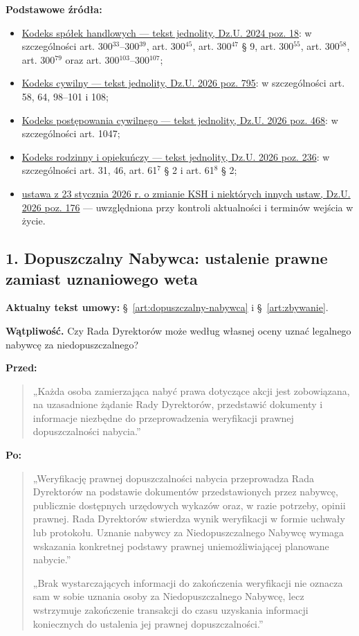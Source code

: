 \documentclass[12pt,a4paper]{report}
\begin{document}
\smallskip
\textbf{Podstawowe źródła:}
\begin{itemize}
  \item \href{https://eli.gov.pl/api/acts/DU/2024/18/text.html}{Kodeks spółek handlowych --- tekst jednolity, Dz.U. 2024 poz. 18}: w szczególności art. 300$^{33}$--300$^{39}$, art. 300$^{45}$, art. 300$^{47}$ § 9, art. 300$^{55}$, art. 300$^{58}$, art. 300$^{79}$ oraz art. 300$^{103}$--300$^{107}$;
  \item \href{https://eli.gov.pl/eli/DU/2026/795/ogl}{Kodeks cywilny --- tekst jednolity, Dz.U. 2026 poz. 795}: w szczególności art. 58, 64, 98--101 i 108;
  \item \href{https://eli.gov.pl/eli/DU/2026/468/ogl}{Kodeks postępowania cywilnego --- tekst jednolity, Dz.U. 2026 poz. 468}: w szczególności art. 1047;
  \item \href{https://eli.gov.pl/eli/DU/2026/236/ogl}{Kodeks rodzinny i opiekuńczy --- tekst jednolity, Dz.U. 2026 poz. 236}: w szczególności art. 31, 46, art. 61$^{7}$ § 2 i art. 61$^{8}$ § 2;
  \item \href{https://eli.gov.pl/eli/DU/2026/176/ogl}{ustawa z 23 stycznia 2026 r. o zmianie KSH i niektórych innych ustaw, Dz.U. 2026 poz. 176} --- uwzględniona przy kontroli aktualności i terminów wejścia w życie.
\end{itemize}

\subsection*{1. Dopuszczalny Nabywca: ustalenie prawne zamiast uznaniowego weta}
\textbf{Aktualny tekst umowy:} §~\ref{art:dopuszczalny-nabywca} i §~\ref{art:zbywanie}.

\textbf{Wątpliwość.} Czy Rada Dyrektorów może według własnej oceny uznać legalnego nabywcę za niedopuszczalnego?

\textbf{Przed:}
\begin{quote}\small
„Każda osoba zamierzająca nabyć prawa dotyczące akcji jest zobowiązana, na uzasadnione żądanie Rady Dyrektorów, przedstawić dokumenty i informacje niezbędne do przeprowadzenia weryfikacji prawnej dopuszczalności nabycia.”
\end{quote}

\textbf{Po:}
\begin{quote}\small
„Weryfikację prawnej dopuszczalności nabycia przeprowadza Rada Dyrektorów na podstawie dokumentów przedstawionych przez nabywcę, publicznie dostępnych urzędowych wykazów oraz, w razie potrzeby, opinii prawnej. Rada Dyrektorów stwierdza wynik weryfikacji w formie uchwały lub protokołu. Uznanie nabywcy za Niedopuszczalnego Nabywcę wymaga wskazania konkretnej podstawy prawnej uniemożliwiającej planowane nabycie.”

„Brak wystarczających informacji do zakończenia weryfikacji nie oznacza sam w sobie uznania osoby za Niedopuszczalnego Nabywcę, lecz wstrzymuje zakończenie transakcji do czasu uzyskania informacji koniecznych do ustalenia jej prawnej dopuszczalności.”
\end{quote}
\end{document}
